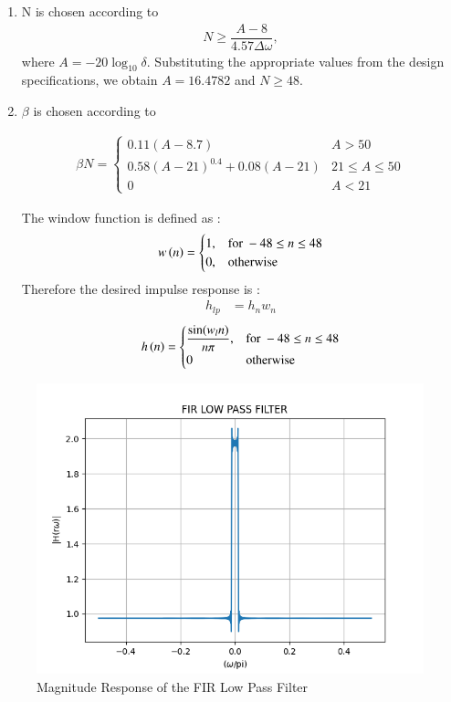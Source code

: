 \documentclass[journal,12pt,twocolumn]{IEEEtran}
\theoremstyle{remark}
\begin{document}
\begin{enumerate}
\item  N is chosen according to
\begin{align}
    N \geq \dfrac{A-8}{4.57\Delta \omega},
\end{align}
where $A = -20\log_{10}\delta$.  Substituting the appropriate values from the design specifications, we obtain
$A = 16.4782$ and $N \geq 48$.


\item  $\beta$ is chosen according to
\begin{small}
    \begin{align}
    \beta N = \left\{ \begin{array}{ll} 0.11(A-8.7) & A > 50 \\
0.58(A-21)^{0.4}+ 0.08(A-21) & 21 \leq A \leq 50 \\
0 & A < 21\end{array} \right.
\end{align}
\end{small}


The window function is defined as :
\begin{align}
    w\left(n\right) = 
\begin{cases} 
    1, & \text{for } -48\leq n \leq 48 \\
    0, & \text{otherwise } 
\end{cases} \label{eq:w(n)_for_Kaiser}
\end{align}
Therefore the desired impulse response is :
\begin{align}
    h_{lp} &= h_{n}w_{n}
\end{align}
\begin{align}
    h\left(n\right) = 
\begin{cases} 
    \dfrac{\sin(w_l n)}{n\pi},  & \text{for } -48\leq n \leq 48 \\
    0 &\text{otherwise}
\end{cases} \label{eq:h(n)desired_for_LPF}
\end{align}
\end{enumerate}
\begin{figure}
    \centering
    \includegraphics[width = \columnwidth]{figs/FIR_Lowpass_Filter.png}
    \caption{Magnitude Response of the FIR Low Pass Filter}
    \label{fig:fir_lpf}
\end{figure}
\end{document}
